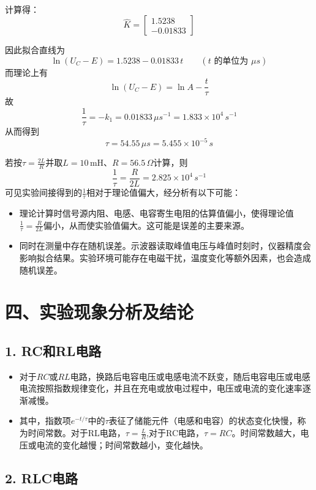 \documentclass{ctexart}
\begin{document}
~

计算得：
$$\widehat{K} = \begin{bmatrix} 1.5238 \\ -0.01833 \end{bmatrix} $$

因此拟合直线为
\[
\ln\left(U_C-E\right)=1.5238-0.01833\,t
\qquad (t\text{ 的单位为 }\mu s)
\]
而理论上有
\[
\ln\left(U_C-E\right)=\ln A-\frac{t}{\tau}
\]
故
\[
\frac{1}{\tau}=-k_1=0.01833\,\mu s^{-1}=1.833\times 10^4\,s^{-1}
\]
从而得到
\[
\tau=54.55\,\mu s=5.455\times10^{-5}\,s
\]

若按$\tau=\frac{2L}{R}$并取$L=10\,\mathrm{mH}$、$R=56.5\,\Omega$计算，则
\[
\frac{1}{\tau}=\frac{R}{2L}=2.825\times 10^4\,s^{-1}
\]
可见实验间接得到的$\frac{1}{\tau}$相对于理论值偏大，经分析有以下可能：

\begin{itemize}
    \item 理论计算时信号源内阻、电感、电容寄生电阻的估算值偏小，使得理论值$\frac{1}{\tau}=\frac{R}{2L}$偏小，从而使实验值偏大。这可能是误差的主要来源。
    \item 同时在测量中存在随机误差。示波器读取峰值电压与峰值时刻时，仪器精度会影响拟合结果。实验环境可能存在电磁干扰，温度变化等额外因素，也会造成随机误差。
\end{itemize}

\section*{四、实验现象分析及结论}
\subsection*{1. RC和RL电路}

\begin{itemize}
    \item 对于$RC$或$RL$电路，换路后电容电压或电感电流不跃变，随后电容电压或电感电流按照指数规律变化，并且在充电或放电过程中，电压或电流的变化速率逐渐减慢。
    \item 其中，指数项$e^{-t/\tau}$中的$\tau$表征了储能元件（电感和电容）的状态变化快慢，称为时间常数。对于RL电路，$\tau = \frac{L}{R}$,对于RC电路，$\tau = RC$。时间常数越大，电压或电流的变化越慢；时间常数越小，变化越快。
\end{itemize}

\subsection*{2. RLC电路}
\end{document}
